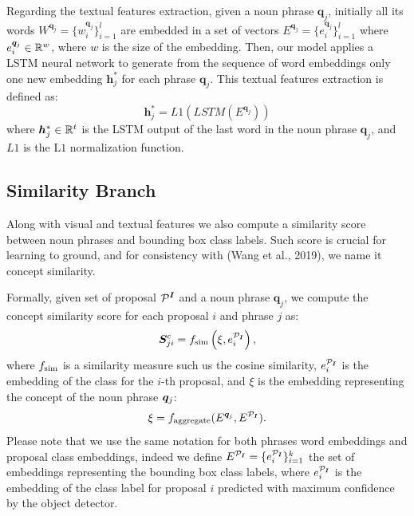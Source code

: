\documentclass{article}
\begin{document}
Regarding the textual features extraction, given a noun phrase
$\bm{q}_j$, initially all its words $W^{\bm{q}_j} = \{ w^{\bm{q}_j}_i
\}^l_{i=1}$ are embedded in a set of vectors $E^{\bm{q}_j} =
\{e^{\bm{q}_j}_i \}^l_{i=1}$ where $e^{\bm{q}_j}_i \in \mathbb{R}^w$, where
$w$ is the size of the embedding. Then, our model applies a LSTM
neural network to generate from the sequence of word embeddings only
one new embedding $\bm{h}^*_j$ for each phrase $\bm{q}_j$. This
textual features extraction is defined as:
\begin{equation}
  \bm{h}^*_j = L1(LSTM(E^{\bm{q}_j}))
\end{equation}
where $\bm{h}^*_j \in \mathbb{R}^t$ is the LSTM output of the last word in
the noun phrase $\bm{q}_j$, and $L1$ is the L$1$ normalization
function.

\subsection{Similarity Branch}

Along with visual and textual features we also compute a similarity
score between noun phrases and bounding box class labels. Such score
is crucial for learning to ground, and for consistency with (Wang et
al., 2019), we name it concept similarity. 



Formally, given set of proposal $\mathcal{P}^{\bm{I}}$ and a noun phrase
$\bm{q}_j$, we compute the concept similarity score for each proposal
$i$ and phrase $j$ as:
\begin{equation}
  \bm{S}^c_{ji} = f_{\text{sim}} \left( \xi, e^{\mathcal{P}_{\bm{I}}}_i \right),
\end{equation}
where $f_{\text{sim}}$ is a similarity measure such us the cosine similarity,
$e^{\mathcal{P}_{\bm{I}}}_i$ is the embedding of the class for the $i$-th proposal, and
$\xi$ is the embedding representing the concept of the noun phrase
$\bm{q}_j$:
\begin{equation}
  \xi = f_{\text{aggregate}}(E^{\bm{q}_j}, E^{\mathcal{P}_{\bm{I}}}).
\end{equation}
Please note that we use the same notation for both phrases word
embeddings and proposal class embeddings, indeed we define $E^{\mathcal{P}_{\bm{I}}} =
\{e^{\mathcal{P}_{\bm{I}}}_i \}^{k}_{i=1}$ the set of embeddings representing the bounding
box class labels, where $e^{\mathcal{P}_{\bm{I}}}_i$ is the embedding of the class label
for proposal $i$ predicted with maximum confidence by the object
detector. 
\end{document}
